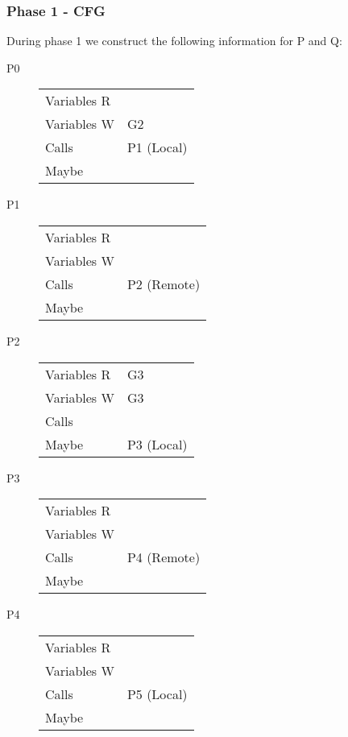 \documentclass{article}
\begin{document}
\pagebreak
\subsubsection{Phase 1 - CFG}
During phase 1 we construct the following information for P and Q:

\begin{multicols}{2}

\begin{description}
\item[P0]
  \begin{tabular}{ll}
    Variables R & \\
    Variables W & G2 \\
    Calls       & P1 (Local) \\
    Maybe       & \\
  \end{tabular}

\item[P1]
  \begin{tabular}{ll}
    Variables R & \\
    Variables W & \\
    Calls       & P2 (Remote) \\
    Maybe       & \\
  \end{tabular}

\item[P2]
  \begin{tabular}{ll}
    Variables R & G3 \\
    Variables W & G3 \\
    Calls       & \\
    Maybe       & P3 (Local) \\
  \end{tabular}

\item[P3]
  \begin{tabular}{ll}
    Variables R & \\
    Variables W & \\
    Calls       & P4 (Remote) \\
    Maybe       & \\
  \end{tabular}

\item[P4]
  \begin{tabular}{ll}
    Variables R & \\
    Variables W & \\
    Calls       & P5 (Local) \\
    Maybe       & \\
  \end{tabular}


\end{description}
\end{multicols}
\end{document}
